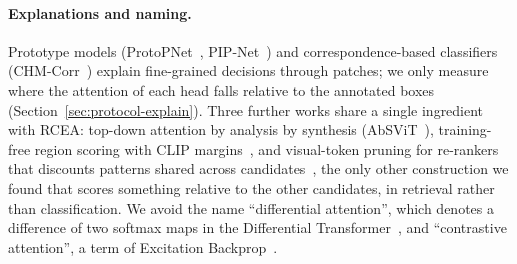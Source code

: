 \documentclass[11pt,a4paper]{article}
\theoremstyle{plain}
\begin{document}
\paragraph{Explanations and naming.}
Prototype models (ProtoPNet~\citep{chen2019protopnet}, PIP-Net~\citep{nauta2023pipnet}) and correspondence-based
classifiers (CHM-Corr~\citep{taesiri2022chmcorr}) explain fine-grained decisions through patches; we only measure
where the attention of each head falls relative to the annotated boxes (Section~\ref{sec:protocol-explain}). Three
further works share a single ingredient with RCEA: top-down attention by analysis by synthesis
(AbSViT~\citep{shi2023absvit}), training-free region scoring with CLIP margins~\citep{zhu2026labelfree}, and
visual-token pruning for re-rankers that discounts patterns shared across candidates~\citep{liu2026radical}, the only
other construction we found that scores something relative to the other candidates, in retrieval rather than
classification. We avoid the name ``differential attention'', which denotes a difference of two softmax maps in the
Differential Transformer~\citep{ye2025difftransformer}, and ``contrastive attention'', a term of Excitation
Backprop~\citep{zhang2016excitation}.
\end{document}

